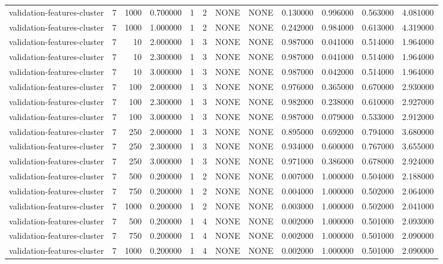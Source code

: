 \begin{tabular}{lrrrllllrrrr}
validation-features-cluster & 7 & 1000 & 0.700000 & 1 & 2 & NONE & NONE & 0.130000 & 0.996000 & 0.563000 & 4.081000 \\
validation-features-cluster & 7 & 1000 & 1.000000 & 1 & 2 & NONE & NONE & 0.242000 & 0.984000 & 0.613000 & 4.319000 \\
validation-features-cluster & 7 & 10 & 2.000000 & 1 & 3 & NONE & NONE & 0.987000 & 0.041000 & 0.514000 & 1.964000 \\
validation-features-cluster & 7 & 10 & 2.300000 & 1 & 3 & NONE & NONE & 0.987000 & 0.041000 & 0.514000 & 1.964000 \\
validation-features-cluster & 7 & 10 & 3.000000 & 1 & 3 & NONE & NONE & 0.987000 & 0.042000 & 0.514000 & 1.964000 \\
validation-features-cluster & 7 & 100 & 2.000000 & 1 & 3 & NONE & NONE & 0.976000 & 0.365000 & 0.670000 & 2.930000 \\
validation-features-cluster & 7 & 100 & 2.300000 & 1 & 3 & NONE & NONE & 0.982000 & 0.238000 & 0.610000 & 2.927000 \\
validation-features-cluster & 7 & 100 & 3.000000 & 1 & 3 & NONE & NONE & 0.987000 & 0.079000 & 0.533000 & 2.912000 \\
validation-features-cluster & 7 & 250 & 2.000000 & 1 & 3 & NONE & NONE & 0.895000 & 0.692000 & 0.794000 & 3.680000 \\
validation-features-cluster & 7 & 250 & 2.300000 & 1 & 3 & NONE & NONE & 0.934000 & 0.600000 & 0.767000 & 3.655000 \\
validation-features-cluster & 7 & 250 & 3.000000 & 1 & 3 & NONE & NONE & 0.971000 & 0.386000 & 0.678000 & 2.924000 \\
validation-features-cluster & 7 & 500 & 0.200000 & 1 & 2 & NONE & NONE & 0.007000 & 1.000000 & 0.504000 & 2.188000 \\
validation-features-cluster & 7 & 750 & 0.200000 & 1 & 2 & NONE & NONE & 0.004000 & 1.000000 & 0.502000 & 2.064000 \\
validation-features-cluster & 7 & 1000 & 0.200000 & 1 & 2 & NONE & NONE & 0.003000 & 1.000000 & 0.502000 & 2.041000 \\
validation-features-cluster & 7 & 500 & 0.200000 & 1 & 4 & NONE & NONE & 0.002000 & 1.000000 & 0.501000 & 2.093000 \\
validation-features-cluster & 7 & 750 & 0.200000 & 1 & 4 & NONE & NONE & 0.002000 & 1.000000 & 0.501000 & 2.090000 \\
validation-features-cluster & 7 & 1000 & 0.200000 & 1 & 4 & NONE & NONE & 0.002000 & 1.000000 & 0.501000 & 2.090000 \\

\end{tabular}

